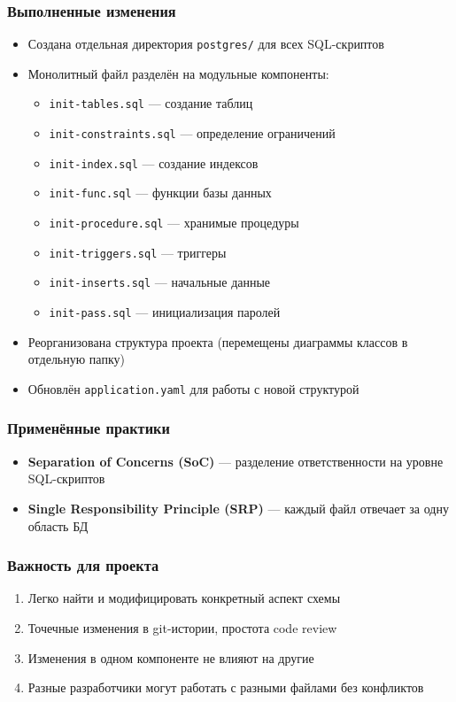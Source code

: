 \documentclass{article}
\begin{document}
\subsubsection{Выполненные изменения}
\begin{itemize}
\item Создана отдельная директория \texttt{postgres/} для всех SQL-скриптов
\item Монолитный файл разделён на модульные компоненты:
\begin{itemize}
\item \texttt{init-tables.sql}  --- создание таблиц
\item \texttt{init-constraints.sql} --- определение ограничений
\item \texttt{init-index.sql} --- создание индексов
\item \texttt{init-func.sql} --- функции базы данных
\item \texttt{init-procedure.sql} --- хранимые процедуры
\item \texttt{init-triggers.sql} --- триггеры
\item \texttt{init-inserts.sql} --- начальные данные
\item \texttt{init-pass.sql} --- инициализация паролей
\end{itemize}
\item Реорганизована структура проекта (перемещены диаграммы классов в отдельную папку)
\item Обновлён \texttt{application.yaml} для работы с новой структурой
\end{itemize}

\subsubsection{Применённые практики}
    \begin{itemize}
    \item \textbf{Separation of Concerns (SoC)} --- разделение ответственности на уровне SQL-скриптов
    \item \textbf{Single Responsibility Principle (SRP)} --- каждый файл отвечает за одну область БД
    \end{itemize}

\subsubsection{Важность для проекта}
    \begin{enumerate}
    \item Легко найти и модифицировать конкретный аспект схемы
    \item Точечные изменения в git-истории, простота code review
    \item Изменения в одном компоненте не влияют на другие
    \item Разные разработчики могут работать с разными файлами без конфликтов
    \end{enumerate}
\end{document}

